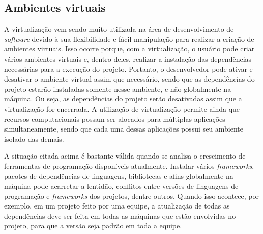 \subsection{{Ambientes virtuais}}

A virtualização vem sendo muito utilizada na área de desenvolvimento de \textit{software} devido à sua flexibilidade e fácil manipulação para realizar a criação de ambientes virtuais. Isso ocorre porque, com a virtualização, o usuário pode criar vários ambientes virtuais e, dentro deles, realizar a instalação das dependências necessárias para a execução do projeto. Portanto, o desenvolvedor pode ativar e desativar o ambiente virtual assim que necessário, sendo que as dependências do projeto estarão instaladas somente nesse ambiente, e não globalmente na máquina. Ou seja, as dependências do projeto serão desativadas assim que a virtualização for encerrada. A utilização de virtualização permite ainda que recursos computacionais possam ser alocados para múltiplas aplicações simultaneamente, sendo que cada uma dessas aplicações possui seu ambiente isolado das demais.

A situação citada acima é bastante válida quando se analisa o crescimento de ferramentas de programação disponíveis atualmente. Instalar vários \textit{frameworks}, pacotes de dependências de linguagens, bibliotecas e afins globalmente na máquina pode acarretar a lentidão, conflitos entre versões de linguagens de programação e \textit{frameworks} dos projetos, dentre outros. Quando isso acontece, por exemplo, em um projeto feito por uma equipe, a atualização de todas as dependências deve ser feita em todas as máquinas que estão envolvidas no projeto, para que a versão seja padrão em toda a equipe.